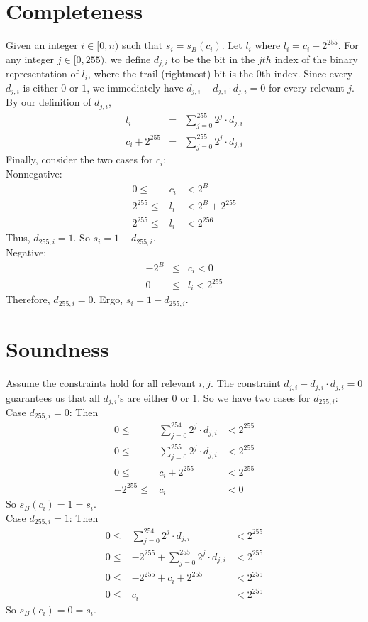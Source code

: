 \documentclass[11pt]{article}
\begin{document}
\section{Completeness}
Given an integer $i\in[0, n)$ such that $s_i = s_B(c_i)$. Let $l_i$ where $l_i=c_i+2^{255}$. 
For any integer $j\in [0, 255)$, we define $d_{j,i}$ to be the bit in the $jth$ index of the binary representation of $l_i$, 
where the trail (rightmost) bit is the $0$th index. Since every $d_{j,i}$ is either $0$ or $1$, 
we immediately have $d_{j,i} - d_{j,i}\cdot d_{j,i}=0$ for every relevant $j$. By our definition of $d_{j,i}$,
\begin{eqnarray*}
l_i&=&\sum_{j=0}^{255} 2^j\cdot d_{j,i}\\
c_i + 2^{255}&=&\sum_{j=0}^{255} 2^j\cdot d_{j,i}
\end{eqnarray*}
Finally, consider the two cases for $c_i$:\\
Nonnegative: 
\begin{eqnarray*}
0\leq& c_i&<2^B\\
2^{255}\leq& l_i&<2^B+2^{255}\\
2^{255}\leq& l_i&<2^{256}
\end{eqnarray*}
Thus, $d_{255,i} = 1$. So $s_i=1-d_{255,i}$.\\
Negative:
\begin{eqnarray*}
-2^B&\leq& c_i<0\\
0&\leq& l_i<2^{255}
\end{eqnarray*}
Therefore, $d_{255,i}=0$. Ergo, $s_i=1-d_{255,i}$.

\section{Soundness}
Assume the constraints hold for all relevant $i,j$. 
The constraint $d_{j,i} - d_{j,i}\cdot d_{j,i}=0$ guarantees us that all $d_{j,i}$'s are either $0$ or $1$. 
So we have two cases for $d_{255,i}$:\\
Case $d_{255,i}=0$: Then
\begin{eqnarray*}
0\leq&\sum_{j=0}^{254} 2^j\cdot d_{j,i}&<2^{255}\\
0\leq&\sum_{j=0}^{255} 2^j\cdot d_{j,i}&<2^{255}\\
0\leq&c_i + 2^{255}&<2^{255}\\
-2^{255}\leq&c_i&<0
\end{eqnarray*}
So $s_B(c_i)=1=s_i$.\\
Case $d_{255,i}=1$: Then
\begin{eqnarray*}
0\leq&\sum_{j=0}^{254} 2^j\cdot d_{j,i}&<2^{255}\\
0\leq&-2^{255}+\sum_{j=0}^{255} 2^j\cdot d_{j,i}&<2^{255}\\
0\leq&-2^{255}+c_i + 2^{255}&<2^{255}\\
0\leq&c_i&<2^{255}
\end{eqnarray*}
So $s_B(c_i)=0=s_i$.
\end{document}
